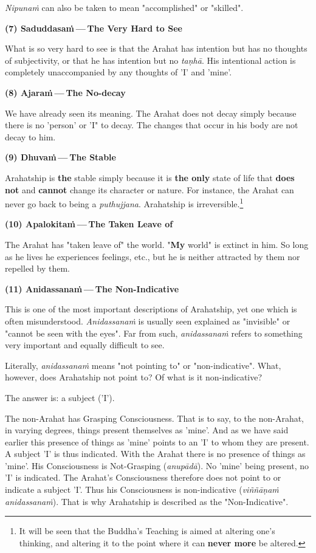 \emph{Nipunaṁ} can also be taken to mean "accomplished" or "skilled".

\textbf{(7) Saduddasaṁ --- The Very Hard to See}

What is so very hard to see is that the Arahat has intention but has no thoughts of subjectivity, or that he has intention but no \emph{taṇhā}. His intentional action is completely unaccompanied by any thoughts of 'I' and 'mine'.

\textbf{(8) Ajaraṁ --- The No-decay}

We have already seen its meaning. The Arahat does not decay simply because there is no 'person' or 'I" to decay. The changes that occur in his body are not decay to him.

\textbf{(9) Dhuvaṁ --- The Stable}

Arahatship is \textbf{the} stable simply because it is \textbf{the only} state of life that \textbf{does not} and \textbf{cannot} change its character or nature. For instance, the Arahat can never go back to being a \emph{puthujjana}. Arahatship is irreversible.\footnote{It will be seen that the Buddha's Teaching is aimed at altering one's thinking, and altering it to the point where it can \textbf{never more} be altered.}

\textbf{(10) Apalokitaṁ --- The Taken Leave of}

The Arahat has "taken leave of" the world. "\textbf{My} world" is extinct in him. So long as he lives he experiences feelings, etc., but he is neither attracted by them nor repelled by them.

\textbf{(11) Anidassanaṁ --- The Non-Indicative}

This is one of the most important descriptions of Arahatship, yet one which is often misunderstood. \emph{Anidassanaṁ} is usually seen explained as "invisible" or "cannot be seen with the eyes". Far from such, \emph{anidassanaṁ} refers to something very important and equally difficult to see.

Literally, \emph{anidassanaṁ} means "not pointing to" or "non-indicative". What, however, does Arahatship not point to? Of what is it non-indicative?

The answer is: a subject ('I').

The non-Arahat has Grasping Consciousness. That is to say, to the non-Arahat, in varying degrees, things present themselves as 'mine'. And as we have said earlier this presence of things as 'mine' points to an 'I' to whom they are present. A subject 'I' is thus indicated. With the Arahat there is no presence of things as 'mine'. His Consciousness is Not-Grasping (\emph{anupādā}). No 'mine' being present, no 'I' is indicated. The Arahat's Consciousness therefore does not point to or indicate a subject 'I'. Thus his Consciousness is non-indicative (\emph{viññāṇaṁ anidassanaṁ}). That is why Arahatship is described as the "Non-Indicative".

